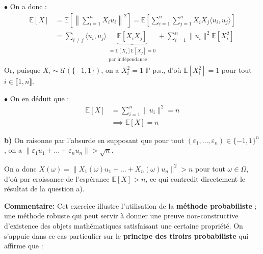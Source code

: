 \documentclass[11pt,a4paper]{report}
\begin{document}
\vspace{0.3cm}
\noindent $\bullet$ On a donc :
\begin{align*}
\mathbb{E}[X] &= \mathbb{E}\left[ \left\| \sum_{i=1}^n X_i u_i \right\|^2 \right] = \mathbb{E}\left[ \sum_{i=1}^n \sum_{j=1}^n X_i X_j \langle u_i, u_j \rangle \right] \\
&= \sum_{i \neq j} \langle u_i, u_j \rangle \underbrace{\mathbb{E}[X_i X_j]}_{\substack{= \mathbb{E}[X_i]\mathbb{E}[X_j] = 0 \\ \text{par indépendance}}} + \sum_{i=1}^n \|u_i\|^2 \mathbb{E}[X_i^2]
\end{align*}
\noindent Or, puisque $X_i \sim \mathcal{U}(\{-1, 1\})$, on a $X_i^2 = 1$ $\mathbb{P}$-p.s., d'où $\mathbb{E}[X_i^2] = 1$ pour tout $i \in \llbracket 1, n \rrbracket$.

\vspace{0.3cm}
\noindent $\bullet$ On en déduit que :
\begin{align*}
\mathbb{E}[X] &= \sum_{i=1}^n \|u_i\|^2 = n \\
&\implies \boxed{\mathbb{E}[X] = n}
\end{align*}
\vspace{0.5cm}

\noindent \textbf{b)} On raisonne par l'absurde en supposant que pour tout $(\varepsilon_1, \dots, \varepsilon_n) \in \{-1, 1\}^n$, on a $\|\varepsilon_1 u_1 + \dots + \varepsilon_n u_n\| > \sqrt{n}$.

\noindent On a donc $X(\omega) = \|X_1(\omega)u_1 + \dots + X_n(\omega)u_n\|^2 > n$ pour tout $\omega \in \Omega$, d'où par croissance de l'espérance $\mathbb{E}[X] > n$, ce qui contredit directement le résultat de la question a).

\begin{center}
\end{center}
\begin{commentaire}
\textbf{Commentaire:} Cet exercice illustre l'utilisation de la \textbf{méthode probabiliste} ; une méthode robuste qui peut servir à donner une preuve non-constructive d'existence des objets mathématiques satisfaisant une certaine propriété. On s'appuie dans ce cas particulier sur le \textbf{principe des tiroirs probabiliste} qui affirme que :
\begin{center}
\end{center}
\end{commentaire}
\end{document}
